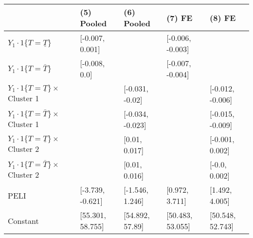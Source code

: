 \begin{tabular}{lllll}
\hline
 & (5) Pooled & (6) Pooled & (7) FE & (8) FE \\
\hline
$Y_1\cdot\text{1}\{T=\underline{T}\}$ & [-0.007, 0.001] &  & [-0.006, -0.003] &  \\
$Y_1\cdot\text{1}\{T=\bar{T}\}$ & [-0.008, 0.0] &  & [-0.007, -0.004] &  \\
$Y_1\cdot\text{1}\{T=\underline{T}\}\times$ Cluster 1 &  & [-0.031, -0.02] &  & [-0.012, -0.006] \\
$Y_1\cdot\text{1}\{T=\bar{T}\}\times$ Cluster 1 &  & [-0.034, -0.023] &  & [-0.015, -0.009] \\
$Y_1\cdot\text{1}\{T=\underline{T}\}\times$ Cluster 2 &  & [0.01, 0.017] &  & [-0.001, 0.002] \\
$Y_1\cdot\text{1}\{T=\bar{T}\}\times$ Cluster 2 &  & [0.01, 0.016] &  & [-0.0, 0.002] \\
PELI & [-3.739, -0.621] & [-1.546, 1.246] & [0.972, 3.711] & [1.492, 4.005] \\
Constant & [55.301, 58.755] & [54.892, 57.89] & [50.483, 53.055] & [50.548, 52.743] \\
\hline
\end{tabular}\hline

